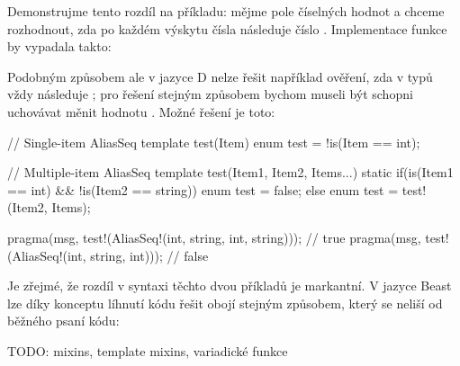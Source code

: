 Demonstrujme tento rozdíl na příkladu: mějme pole číselných hodnot  a chceme rozhodnout, zda po každém výskytu čísla  následuje číslo . Implementace funkce by vypadala takto:
\pagebreak
{}

Podobným způsobem ale v jazyce D nelze řešit například ověření, zda v  typů  vždy následuje ; pro řešení stejným způsobem bychom museli být schopni uchovávat měnit hodnotu . Možné řešení je toto:

\begin{dcode}
// Single-item AliasSeq
template test(Item) {
	enum test = !is(Item == int);
}

// Multiple-item AliasSeq
template test(Item1, Item2, Items...) {
	static if(is(Item1 == int) && !is(Item2 == string))
		enum test = false;
	else
		enum test = test!(Item2, Items);
}

pragma(msg, test!(AliasSeq!(int, string, int, string))); // true
pragma(msg, test!(AliasSeq!(int, string, int))); // false
\end{dcode}

Je zřejmé, že rozdíl v syntaxi těchto dvou příkladů je markantní. V jazyce Beast lze díky konceptu líhnutí kódu řešit obojí stejným způsobem, který se neliší od běžného psaní kódu:


TODO: mixins, template mixins, variadické funkce


